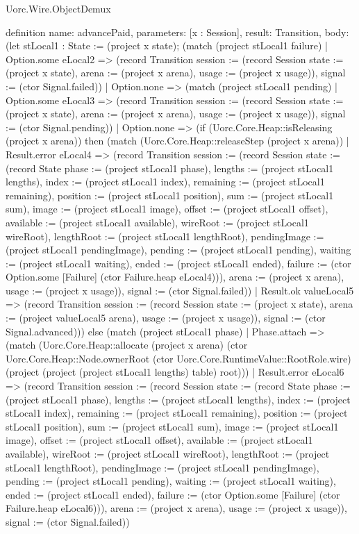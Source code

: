 \begin{lexlean}{Uorc.Wire.ObjectDemux}
\begin{semanticmodule}
definition{
  name: advancePaid,
  parameters: [x : Session],
  result: Transition,
  body: (let stLocal1 : State := (project x state); (match (project stLocal1 failure)
    | Option.some eLocal2 => (record Transition {session := (record Session {state := (project x state), arena := (project x arena), usage := (project x usage)}), signal := (ctor Signal.failed)})
    | Option.none => (match (project stLocal1 pending)
      | Option.some eLocal3 => (record Transition {session := (record Session {state := (project x state), arena := (project x arena), usage := (project x usage)}), signal := (ctor Signal.pending)})
      | Option.none => (if (Uorc.Core.Heap::isReleasing (project x arena)) then (match (Uorc.Core.Heap::releaseStep (project x arena))
        | Result.error eLocal4 => (record Transition {session := (record Session {state := (record State {phase := (project stLocal1 phase), lengths := (project stLocal1 lengths), index := (project stLocal1 index), remaining := (project stLocal1 remaining), position := (project stLocal1 position), sum := (project stLocal1 sum), image := (project stLocal1 image), offset := (project stLocal1 offset), available := (project stLocal1 available), wireRoot := (project stLocal1 wireRoot), lengthRoot := (project stLocal1 lengthRoot), pendingImage := (project stLocal1 pendingImage), pending := (project stLocal1 pending), waiting := (project stLocal1 waiting), ended := (project stLocal1 ended), failure := (ctor Option.some [Failure] (ctor Failure.heap eLocal4))}), arena := (project x arena), usage := (project x usage)}), signal := (ctor Signal.failed)})
        | Result.ok valueLocal5 => (record Transition {session := (record Session {state := (project x state), arena := (project valueLocal5 arena), usage := (project x usage)}), signal := (ctor Signal.advanced)})) else (match (project stLocal1 phase)
        | Phase.attach => (match (Uorc.Core.Heap::allocate (project x arena) (ctor Uorc.Core.Heap::Node.ownerRoot (ctor Uorc.Core.RuntimeValue::RootRole.wire) (project (project (project stLocal1 lengths) table) root)))
          | Result.error eLocal6 => (record Transition {session := (record Session {state := (record State {phase := (project stLocal1 phase), lengths := (project stLocal1 lengths), index := (project stLocal1 index), remaining := (project stLocal1 remaining), position := (project stLocal1 position), sum := (project stLocal1 sum), image := (project stLocal1 image), offset := (project stLocal1 offset), available := (project stLocal1 available), wireRoot := (project stLocal1 wireRoot), lengthRoot := (project stLocal1 lengthRoot), pendingImage := (project stLocal1 pendingImage), pending := (project stLocal1 pending), waiting := (project stLocal1 waiting), ended := (project stLocal1 ended), failure := (ctor Option.some [Failure] (ctor Failure.heap eLocal6))}), arena := (project x arena), usage := (project x usage)}), signal := (ctor Signal.failed)})
}
\end{semanticmodule}
\end{lexlean}
